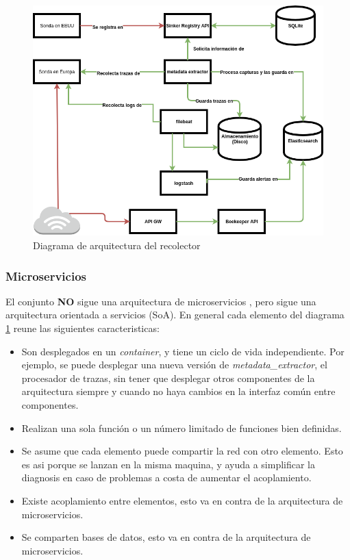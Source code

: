 \begin{figure}[h]
    \centering
      \includegraphics[scale=0.5]{images/collector_architecture}
    \caption{Diagrama de arquitectura del recolector}
    \label{fig:arquitectura-recolector}
  \end{figure}

\subsubsection{Microservicios}

El conjunto \textbf{NO} sigue una arquitectura de microservicios \cite{fowler-microservices}, pero sigue una arquitectura
orientada a servicios (SoA). En general cada elemento del diagrama \ref{fig:arquitectura-recolector} reune las siguientes
caracteristicas:

\begin{itemize}
    \item Son desplegados en un \emph{container}, y tiene un ciclo de vida independiente. Por ejemplo, se puede desplegar una nueva
    versión de \emph{metadata\_extractor}, el procesador de trazas, sin tener que desplegar otros componentes de la arquitectura
    siempre y cuando no haya cambios en la interfaz común entre componentes.
    \item Realizan una sola función o un número limitado de funciones bien definidas.
    \item Se asume que cada elemento puede compartir la red con otro elemento. Esto es asi porque se lanzan en la misma maquina, y ayuda
    a simplificar la diagnosis en caso de problemas a costa de aumentar el acoplamiento.
    \item Existe acoplamiento entre elementos, esto va en contra de la arquitectura de microservicios.
    \item Se comparten bases de datos, esto va en contra de la arquitectura de microservicios.
\end{itemize}

